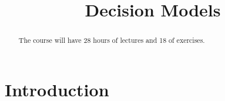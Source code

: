 \documentclass[11pt, twocolumn]{article}
\title{\textbf{Decision Models}}
\author{}
\date{}
\begin{document}
\maketitle
\begin{abstract}
  The course will have 28 hours of lectures and 18 of exercises.
  
\end{abstract}
\newpage
\part{Introduction}
\end{document}
